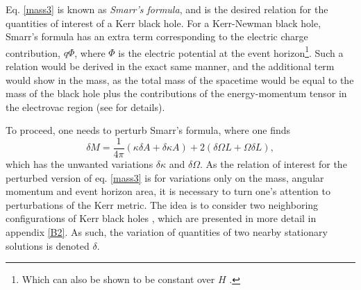\documentclass[
12pt,		%
openright,	%
twoside,  %
a4paper,			%
chapter=TITLE,		%
english,			%
french,				%
spanish,			%
brazil				%
]{USPSC-classe/USPSC}
\begin{document}
Eq. \ref{mass3} is known as \textit{Smarr's formula}, and is the desired relation for the quantities of interest of a Kerr black hole. For a Kerr-Newman black hole, Smarr's formula has an extra term corresponding to the electric charge contribution, $q\Phi $, where $\Phi$ is the electric potential at the event horizon\footnote{Which can also be shown to be constant over $H$ \cite{Heusler1996}.}. Such a relation would be derived in the exact same manner, and the additional term would show in the mass, as the total mass of the spacetime would be equal to the mass of the black hole plus the contributions of the energy-momentum tensor in the electrovac region (see \cite{Heusler1996} for details). 

To proceed, one needs to perturb Smarr's formula, where one finds
\begin{equation}\label{Smarrper}
    \delta M=\frac{1}{4\pi}(\kappa\delta A+\delta\kappa A)+2(\delta\Omega L+\Omega \delta L),
\end{equation}
which has the unwanted variations $\delta\kappa$ and $\delta\Omega$. As the relation of interest for the perturbed version of eq. \ref{mass3} is for variations only on the mass, angular momentum and event horizon area, it is necessary to turn one's attention to perturbations of the Kerr metric. The idea is to consider two neighboring configurations of Kerr black holes \cite{Bardeen1973}, which are presented in more detail in appendix \ref{B2}. As such, the variation of quantities of two nearby stationary solutions is denoted $\delta$. 
\end{document}
